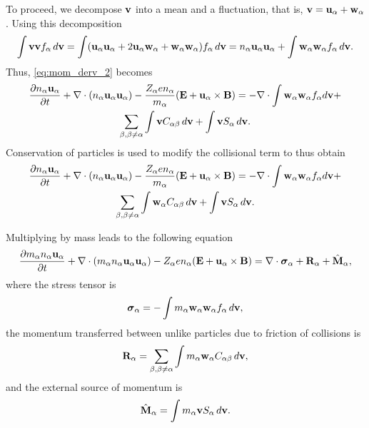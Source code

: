 \documentclass[oneside,a4paper,11pt]{report}
\newcommand*\widefbox[1]{\fbox{\hspace{0.2em}#1\hspace{0.2em}}}
\begin{document}
To proceed, we decompose $\mathbf{v}$ into a mean and a fluctuation, that is, $\mathbf{v} = \mathbf{u}_\alpha + \mathbf{w}_\alpha$. Using this decomposition 
\begin{equation}
\label{eq:identity_vv}
\int \mathbf{v} \mathbf{v} f_\alpha \, d\mathbf{v} = \int ( \mathbf{u}_\alpha \mathbf{u}_\alpha + 2 \mathbf{u}_\alpha \mathbf{w}_\alpha + \mathbf{w}_\alpha \mathbf{w}_\alpha) f_\alpha \, d\mathbf{v} = n_\alpha \mathbf{u}_\alpha \mathbf{u}_\alpha + \int \mathbf{w}_\alpha \mathbf{w}_\alpha f_\alpha \, d\mathbf{v}.
\end{equation}
Thus, \cref{eq:mom_derv_2} becomes
\begin{multline}
\label{eq:mom_derv_3}
\frac{\partial n_\alpha \mathbf{u}_\alpha}{\partial t} + \nabla \cdot \left ( n_\alpha \mathbf{u}_\alpha \mathbf{u}_\alpha \right) - \frac{Z_\alpha e n_\alpha}{m_\alpha} ( \mathbf{E} + \mathbf{u}_\alpha \times \mathbf{B} ) = -\nabla \cdot \int \mathbf{w}_\alpha \mathbf{w}_\alpha f_\alpha d\mathbf{v} + \\
\sum_{\beta, \beta \ne \alpha} \int \mathbf{v} C_{\alpha \beta} \, d\mathbf{v} + \int \mathbf{v} S_\alpha \, d\mathbf{v}.
\end{multline}
Conservation of particles is used to modify the collisional term to thus obtain
\begin{multline}
\label{eq:mom_derv_4}
\frac{\partial n_\alpha \mathbf{u}_\alpha}{\partial t} + \nabla \cdot \left ( n_\alpha \mathbf{u}_\alpha \mathbf{u}_\alpha \right) - \frac{Z_\alpha e n_\alpha}{m_\alpha} ( \mathbf{E} + \mathbf{u}_\alpha \times \mathbf{B} ) = -\nabla \cdot \int \mathbf{w}_\alpha \mathbf{w}_\alpha f_\alpha d\mathbf{v} + \\
\sum_{\beta, \beta \ne \alpha} \int \mathbf{w}_\alpha C_{\alpha \beta} \, d\mathbf{v} + \int \mathbf{v} S_\alpha \, d\mathbf{v}.
\end{multline}

Multiplying by mass leads to the following equation
\begin{equation}
\label{eq:mom_derv_5}
\frac{\partial m_\alpha n_\alpha \mathbf{u}_\alpha}{\partial t} + \nabla \cdot \left ( m_\alpha n_\alpha \mathbf{u}_\alpha \mathbf{u}_\alpha \right) - Z_\alpha e n_\alpha ( \mathbf{E} + \mathbf{u}_\alpha \times \mathbf{B} ) = \nabla \cdot \boldsymbol{\sigma}_\alpha + \mathbf{R}_\alpha + \hat{\mathbf{M}}_\alpha,
\end{equation}
where the stress tensor is
\begin{equation}
\boldsymbol{\sigma}_\alpha = -\int m_\alpha \mathbf{w}_\alpha \mathbf{w}_\alpha f_\alpha \, d\mathbf{v},
\end{equation}
the momentum transferred between unlike particles due to friction of collisions is
\begin{equation}
\mathbf{R}_\alpha = \sum_{\beta, \beta \ne \alpha} \int m_\alpha \mathbf{w}_\alpha C_{\alpha \beta} \, d\mathbf{v},
\end{equation}
and the external source of momentum is
\begin{equation}
\hat{\mathbf{M}}_\alpha = \int m_\alpha \mathbf{v} S_\alpha \, d\mathbf{v}.
\end{equation}
 
\end{document}
